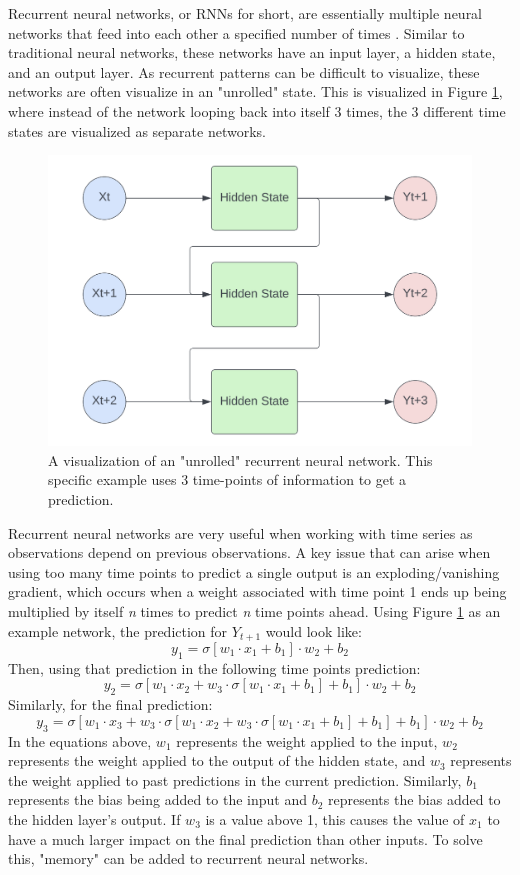 Recurrent neural networks, or RNNs for short, are essentially multiple neural networks that feed into each other a specified number of times \citep{rumelhart1986learning}. Similar to traditional neural networks, these networks have an input layer, a hidden state, and an output layer. As recurrent patterns can be difficult to visualize, these networks are often visualize in an "unrolled" state. This is visualized in Figure \ref{fig:RNN}, where instead of the network looping back into itself 3 times, the 3 different time states are visualized as separate networks.

\begin{figure}[ht]
    \centering
    \includegraphics[width=0.6\linewidth]{"Figures/Recurrent_NN.png"}
    \caption{A visualization of an "unrolled" recurrent neural network. This specific example uses 3 time-points of information to get a prediction.}
    \label{fig:RNN}
\end{figure}

Recurrent neural networks are very useful when working with time series as observations depend on previous observations. A key issue that can arise when using too many time points to predict a single output is an exploding/vanishing gradient, which occurs when a weight associated with time point 1 ends up being multiplied by itself \textit{n} times to predict \textit{n} time points ahead. Using Figure \ref{fig:RNN} as an example network, the prediction for $Y_{t+1}$ would look like:
\begin{equation*}
    y_1 = \sigma[w_1\cdot x_1 + b_1]\cdot w_2 + b_2
\end{equation*}
Then, using that prediction in the following time points prediction:
\begin{equation*}
    y_2 = \sigma[w_1\cdot x_2 + w_3\cdot\sigma[w_1\cdot x_1 + b_1] + b_1]\cdot w_2 + b_2
\end{equation*}
Similarly, for the final prediction:
\begin{equation*}
    y_3 = \sigma[w_1\cdot x_3 + w_3\cdot \sigma[w_1\cdot x_2 + w_3\cdot\sigma[w_1\cdot x_1 + b_1] + b_1] + b_1]\cdot w_2 + b_2
\end{equation*}
In the equations above, $w_1$ represents the weight applied to the input, $w_2$ represents the weight applied to the output of the hidden state, and $w_3$ represents the weight applied to past predictions in the current prediction. Similarly, $b_1$ represents the bias being added to the input and $b_2$ represents the bias added to the hidden layer's output. If $w_3$ is a value above 1, this causes the value of $x_1$ to have a much larger impact on the final prediction than other inputs. To solve this, "memory" can be added to recurrent neural networks.